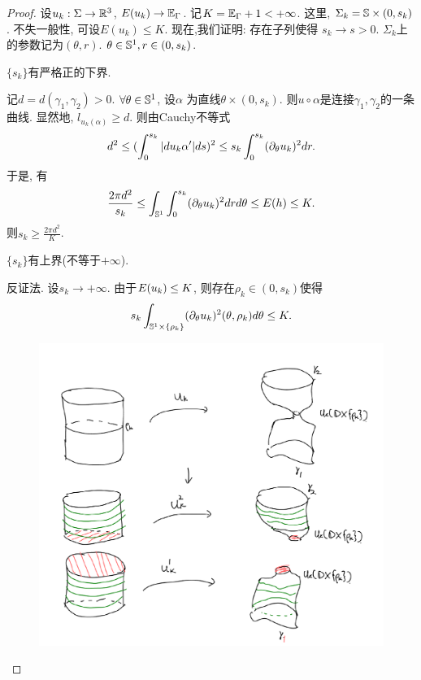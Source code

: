 \begin{proof}
    设$u_k: \Sigma \to \R^3$, $E(u_k) \to \EE_{\Gamma}$.  记$K=\EE_{\Gamma}+1 < +\infty$. 这里, $\Sigma_k = \S\times (0,s_k)$. 不失一般性, 可设$E(u_k) \le K$. 现在,我们证明: 存在子列使得 $s_k \to s >0$.  $\Sigma_k$上的参数记为$(\theta,r)$. $\theta \in \S^1, r \in (0,s_k)$.
    \begin{claim}
        $\{s_k\}$有严格正的下界.
        \begin{subproof}
            记$d=d(\gamma_1,\gamma_2)>0$. $\forall \theta \in \S^1$, 设$\alpha$ 为直线$\theta \times (0, s_k)$. 则$u\circ\alpha$是连接$\gamma_1,\gamma_2$的一条曲线. 显然地, $l_{u_k(\alpha)} \ge d$. 则由Cauchy不等式
            \begin{equation}
                d^2 \le (\int^{s_k}_0 \abs{du_k \alpha'} ds)^2 \le s_k \int^{s_k}_0 (\PTT{u_k})^2dr.
            \end{equation}
            于是, 有
            \begin{equation}\label{annulus_small_energy}
                \frac{2\pi d^2}{s_k} \le \int_{\S^1}\int^{s_k}_0 (\PTT{u_k})^2 drd\theta \le E(h) \le K.
            \end{equation}
            则$s_k \ge \frac{2\pi d^2}{K}$.
        \end{subproof}
    \end{claim}
    \begin{claim}
        $\{s_k\}$有上界(不等于$+\infty$).
        \begin{subproof}
            反证法.  设$s_k \to +\infty$. 由于$\E(u_k) \le K$,  则存在$\rho_k \in (0, s_k)$使得
            \begin{equation}
                s_k\int_{\S^1 \times \{\rho_k\}} (\PTT{u_k})^2(\theta,\rho_k) d\theta \le K.
            \end{equation}
            \begin{figure}[!h]
                \centering
                \includegraphics[scale=0.6]{images/closed_degenerate.png}

\end{figure}
\end{subproof}
\end{claim}
\end{proof}
